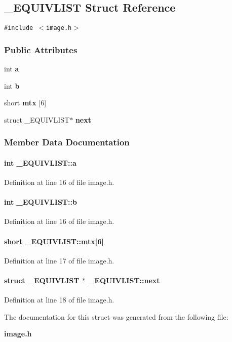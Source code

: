 \subsection{\_\-EQUIVLIST  Struct Reference}
\label{_EQUIVLIST}
{\tt \#include $<$image.h$>$}

\subsubsection*{Public Attributes}
\begin{CompactItemize}
\item 
int {\bf a}
\item 
int {\bf b}
\item 
short {\bf mtx} [6]
\item 
struct \_\-EQUIVLIST$\ast$ {\bf next}
\end{CompactItemize}


\subsubsection{Member Data Documentation}
\label{_EQUIVLIST_m0}
\paragraph{\setlength{\rightskip}{0pt plus 5cm}int \_\-EQUIVLIST::a}\hfill



Definition at line 16 of file image.h.\label{_EQUIVLIST_m1}
\paragraph{\setlength{\rightskip}{0pt plus 5cm}int \_\-EQUIVLIST::b}\hfill



Definition at line 16 of file image.h.\label{_EQUIVLIST_m2}
\paragraph{\setlength{\rightskip}{0pt plus 5cm}short \_\-EQUIVLIST::mtx[6]}\hfill



Definition at line 17 of file image.h.\label{_EQUIVLIST_m3}
\paragraph{\setlength{\rightskip}{0pt plus 5cm}struct \_\-EQUIVLIST $\ast$ \_\-EQUIVLIST::next}\hfill



Definition at line 18 of file image.h.

The documentation for this struct was generated from the following file:\begin{CompactItemize}
\item 
{\bf image.h}\end{CompactItemize}
